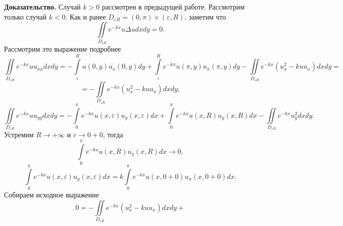 \documentclass[12pt, a4paper]{article}
\begin{document}
	\textbf{Доказательство.}
	Случай $k>0$ рассмотрен в предыдущей работе. Рассмотрим только случай $k < 0$.
	Как и ранее $D_{\varepsilon R} = (0, \pi) \times (\varepsilon, R)$, заметим что
	\begin{equation*}
		\iint\limits_{D_{\varepsilon R}} e^{-k x} u \Delta u dx dy = 0.
	\end{equation*}
	Рассмотрим это выражение подробнее
	\begin{equation*}
		\iint\limits_{D_{\varepsilon R}} e^{-kx} u u_{xx} dx dy = -\int\limits_{\varepsilon}^{R} u(0, y) u_x(0, y) dy + \int\limits_{\varepsilon}^{R} e^{-k\pi} u(\pi, y) u_x(\pi, y) dy - \iint\limits_{D_{\varepsilon R}} e^{-kx} \left(u_x^2 -k u u_x\right) dx dy  = 
	\end{equation*}
	\begin{equation*}
		= - \iint\limits_{D_{\varepsilon R}} e^{-kx} \left(u_x^2 -k u u_x\right) dx dy,
	\end{equation*}
	\begin{equation*}
		\iint\limits_{D_{\varepsilon R}} e^{-kx} u u_{yy} dx dy = -\int\limits_{0}^{\pi} e^{-kx} u(x,\varepsilon) u_y(x, \varepsilon) dx + \int\limits_{0}^{\pi} e^{-kx} u(x, R) u_y(x, R) dx - \iint\limits_{D_{\varepsilon R}} e^{-kx} u_y^2 dx dy.
	\end{equation*}
	Устремим $R \to + \infty$ и $\varepsilon \to 0+0$, тогда
		\begin{equation*}
	\int\limits_{0}^{\pi} e^{-kx} u(x, R) u_y(x, R) dx  \to 0,
	\end{equation*}
	\begin{equation*}
		\int\limits_{0}^{\pi} e^{-kx} u(x,\varepsilon) u_y(x, \varepsilon) dx = k \int\limits_0^\pi e^{-kx} u(x,0+0) u_x(x, 0+0) dx.
	\end{equation*}
	Собираем исходное выражение
	\begin{equation*}
		0 = - \iint\limits_{D_{\varepsilon R}} e^{-kx} \left(u_x^2 -k u u_x\right) dx dy + 
	\end{equation*}
	
\end{document}
